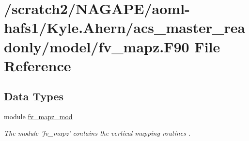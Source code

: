 \section{/scratch2/\-N\-A\-G\-A\-P\-E/aoml-\/hafs1/\-Kyle.Ahern/acs\-\_\-master\-\_\-readonly/model/fv\-\_\-mapz.F90 File Reference}
\label{fv__mapz_8F90}
\subsection*{Data Types}
\begin{DoxyCompactItemize}
\item 
module \hyperlink{classfv__mapz__mod}{fv\-\_\-mapz\-\_\-mod}
\begin{DoxyCompactList}\small\item\em The module 'fv\-\_\-mapz' contains the vertical mapping routines \cite{lin2004vertically}. \end{DoxyCompactList}\end{DoxyCompactItemize}
